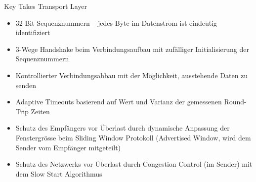 \begin{KR}{Key Takes Transport Layer}
\begin{itemize}
        \begin{itemize}
            \item 32-Bit Sequenznummern – jedes Byte im Datenstrom ist eindeutig identifiziert
            \item 3-Wege Handshake beim Verbindungsaufbau mit zufälliger Initialisierung der Sequenznummern
            \item Kontrollierter Verbindungsabbau mit der Möglichkeit, ausstehende Daten zu senden
            \item Adaptive Timeouts basierend auf Wert und Varianz der gemessenen Round-Trip Zeiten
            \item Schutz des Empfängers vor Überlast durch dynamische Anpassung der Fenstergrösse beim Sliding Window Protokoll (Advertised Window, wird dem Sender vom Empfänger mitgeteilt)
            \item Schutz des Netzwerks vor Überlast durch Congestion Control (im Sender) mit dem Slow Start Algorithmus
        \end{itemize}
    \end{itemize}

\end{KR}
